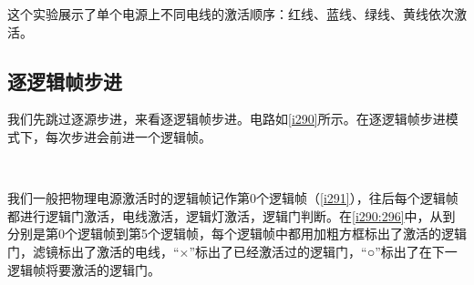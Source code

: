 这个实验展示了单个电源上不同电线的激活顺序：红线、蓝线、绿线、黄线依次激活。

\subsection{逐逻辑帧步进}
我们先跳过逐源步进，来看逐逻辑帧步进。电路如\autoref{i290}所示。在逐逻辑帧步进模式下，每次步进会前进一个逻辑帧。
\begin{figure}
\begin{center}
\\
\qquad
{}
\qquad
{}
\qquad
{}
\qquad
{}
\qquad
{}
\end{center}
\caption{}\label{i290:296}
\end{figure}

我们一般把物理电源激活时的逻辑帧记作第0个逻辑帧（\autoref{i291}），往后每个逻辑帧都进行逻辑门激活，电线激活，逻辑灯激活，逻辑门判断。在\autoref{i290:296}中，从到分别是第0个逻辑帧到第5个逻辑帧，每个逻辑帧中都用加粗方框标出了激活的逻辑门，滤镜标出了激活的电线，“×”标出了已经激活过的逻辑门，“○”标出了在下一逻辑帧将要激活的逻辑门。

